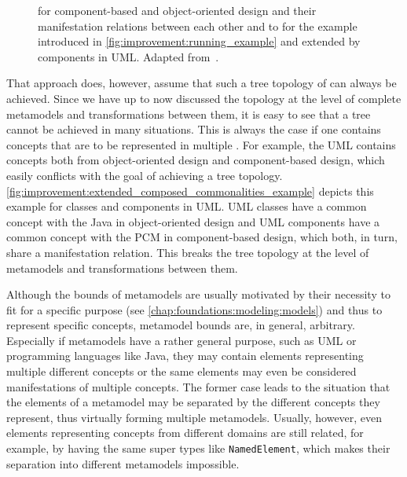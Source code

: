 \begin{figure}
    \centering
    
    \caption[Example for tree topology of \commonalities]{\Conceptmetamodels for component-based and object-oriented design and their manifestation relations between each other and to \concretemetamodels for the example introduced in \autoref{fig:improvement:running_example} and extended by components in \gls{UML}. Adapted from~.}
    \label{fig:improvement:extended_composed_commonalities_example}
\end{figure}

That approach does, however, assume that such a tree topology of \conceptmetamodels can always be achieved.
Since we have up to now discussed the topology at the level of complete metamodels and transformations between them, it is easy to see that a tree cannot be achieved in many situations.
This is always the case if one \concretemetamodel contains concepts that are to be represented in multiple \conceptmetamodels.
For example, the \gls{UML} contains concepts both from object-oriented design and component-based design, which easily conflicts with the goal of achieving a tree topology.
\autoref{fig:improvement:extended_composed_commonalities_example} depicts this example for classes and components in \gls{UML}.
\gls{UML} classes have a common concept with the \concretemetamodels Java in object-oriented design and \gls{UML} components have a common concept with the \concretemetamodel \gls{PCM} in component-based design, which both, in turn, share a manifestation relation. This breaks the tree topology at the level of metamodels and transformations between them.

Although the bounds of metamodels are usually motivated by their necessity to fit for a specific purpose (see \autoref{chap:foundations:modeling:models}) and thus to represent specific concepts, metamodel bounds are, in general, arbitrary.
Especially if metamodels have a rather general purpose, such as \gls{UML} or programming languages like Java, they may contain elements representing multiple different concepts or the same elements may even be considered manifestations of multiple concepts.
The former case leads to the situation that the elements of a metamodel may be separated by the different concepts they represent, thus virtually forming multiple metamodels.
Usually, however, even elements representing concepts from different domains are still related, for example, by having the same super types like \texttt{NamedElement}, which makes their separation into different metamodels impossible.

